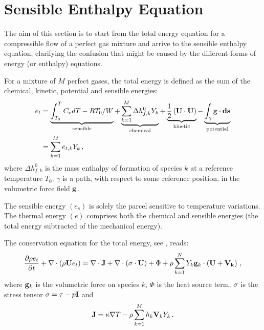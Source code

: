 \section{Sensible Enthalpy Equation}\label{appendix 1}

The aim of this section is to start from the total energy equation for a compressible flow of a perfect gas mixture and arrive to the sensible enthalpy equation, clarifying the confusion that might be caused by the different forms of energy (or enthalpy) equations. 

For a mixture of $M$ perfect gases, the total energy is defined as the sum of the chemical, kinetic, potential and sensible energies:
\begin{equation}
\begin{split}
 e_t &= \underbrace{\int_{T_0}^T C_v dT -RT_0/W}_{\text{sensible}} + \underbrace{\sum_{k=1}^{M} \Delta h_{f,k}^{0} Y_k}_{\text{chemical}} + \underbrace{\frac{1}{2}\left( \mathbf{U}\cdot \mathbf{U} \right)}_{\text{kinetic}} - \underbrace{\int_{\gamma} \mathbf{g} \cdot \mathbf{ds}}_{\text{potential}}
\\ &= \sum_{k=1}^{M} e_{t,k} Y_k \, ,
\end{split}
\end{equation}
where $\Delta h_{f,k}^{0}$ is the mass enthalpy of formation of species $k$ at a reference temperature $T_0$. $\gamma$ is a path, with respect to some reference position, in the volumetric force field $\mathbf{g}$.

The sensible energy $(e_s)$ is solely the parcel sensitive to temperature variations. The thermal energy $(e)$ comprises both the chemical and sensible energies (the total energy subtracted of the mechanical energy). 

The conservation equation for the total energy, see \cite{poinsot2005theoretical}, reads:
\begin{equation}\label{ap: et}
 \frac{\partial \rho e_t}{\partial t} + \nabla \cdot \left( \rho \bv{U} e_t\right) = \nabla \cdot \bv{J} + \nabla \cdot \left( \bv{\sigma} \cdot \bv{U} \right) + \Phi + \rho \sum_{k=1}^N Y_k \bv{g}_k \cdot \left( \bv{U}+\bv{V_k}\right) \, ,
\end{equation}
where $\mathbf{g}_k$ is the volumetric force on species $k$, $\Phi$ is the heat source term, $\mathbf{\sigma}$ is the stress tensor $\mathbf{\sigma} = \mathbf{\tau} -p\mathbf{I}$ and
\begin{equation}
 \mathbf{J} =  \kappa \nabla T - \rho \sum_{k=1}^{M} h_{k} \mathbf{V}_k Y_k \, .
\end{equation}

